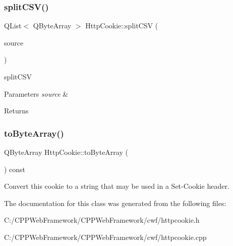 \subsubsection{\texorpdfstring{split\+C\+S\+V()}{splitCSV()}}
{\footnotesize\ttfamily Q\+List$<$ Q\+Byte\+Array $>$ Http\+Cookie\+::split\+C\+SV (\begin{DoxyParamCaption}\item[{const Q\+Byte\+Array \&}]{source }\end{DoxyParamCaption})\hspace{0.3cm}{\ttfamily [static]}}



split\+C\+SV 


\begin{DoxyParams}{Parameters}
{\em source} & \\
\hline
\end{DoxyParams}
\begin{DoxyReturn}{Returns}

\end{DoxyReturn}
\mbox{\label{class_http_cookie_aef937847dbebf7290e94b94afbb8f9a1}} 
\subsubsection{\texorpdfstring{to\+Byte\+Array()}{toByteArray()}}
{\footnotesize\ttfamily Q\+Byte\+Array Http\+Cookie\+::to\+Byte\+Array (\begin{DoxyParamCaption}{ }\end{DoxyParamCaption}) const}

Convert this cookie to a string that may be used in a Set-\/\+Cookie header. 

The documentation for this class was generated from the following files\+:\begin{DoxyCompactItemize}
\item 
C\+:/\+C\+P\+P\+Web\+Framework/\+C\+P\+P\+Web\+Framework/cwf/httpcookie.\+h\item 
C\+:/\+C\+P\+P\+Web\+Framework/\+C\+P\+P\+Web\+Framework/cwf/httpcookie.\+cpp\end{DoxyCompactItemize}
